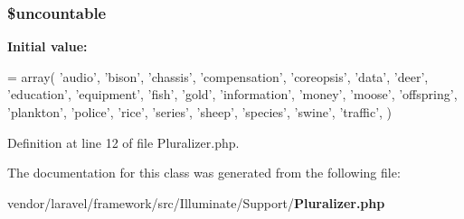 \subsubsection[{\$uncountable}]{\setlength{\rightskip}{0pt plus 5cm}\${\bf uncountable}\hspace{0.3cm}{\ttfamily [static]}}\label{class_illuminate_1_1_support_1_1_pluralizer_a6c0ce8e9449bb15897cb2ef89d7e6c14}
{\bfseries Initial value\+:}
\begin{DoxyCode}
= array(
        \textcolor{stringliteral}{'audio'},
        \textcolor{stringliteral}{'bison'},
        \textcolor{stringliteral}{'chassis'},
        \textcolor{stringliteral}{'compensation'},
        \textcolor{stringliteral}{'coreopsis'},
        \textcolor{stringliteral}{'data'},
        \textcolor{stringliteral}{'deer'},
        \textcolor{stringliteral}{'education'},
        \textcolor{stringliteral}{'equipment'},
        \textcolor{stringliteral}{'fish'},
        \textcolor{stringliteral}{'gold'},
        \textcolor{stringliteral}{'information'},
        \textcolor{stringliteral}{'money'},
        \textcolor{stringliteral}{'moose'},
        \textcolor{stringliteral}{'offspring'},
        \textcolor{stringliteral}{'plankton'},
        \textcolor{stringliteral}{'police'},
        \textcolor{stringliteral}{'rice'},
        \textcolor{stringliteral}{'series'},
        \textcolor{stringliteral}{'sheep'},
        \textcolor{stringliteral}{'species'},
        \textcolor{stringliteral}{'swine'},
        \textcolor{stringliteral}{'traffic'},
    )
\end{DoxyCode}


Definition at line 12 of file Pluralizer.\+php.



The documentation for this class was generated from the following file\+:\begin{DoxyCompactItemize}
\item 
vendor/laravel/framework/src/\+Illuminate/\+Support/{\bf Pluralizer.\+php}\end{DoxyCompactItemize}
